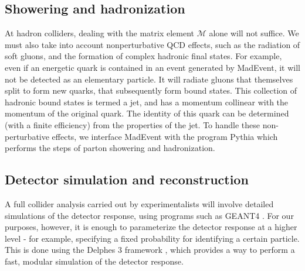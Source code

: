 \subsection{Showering and hadronization}
At hadron colliders, dealing with the matrix element $\mathcal{M}$ alone will not suffice. We must also take into account nonperturbative QCD effects, such as the radiation of soft gluons, and the formation of complex hadronic final states. For example, even if an energetic quark is contained in an event generated by MadEvent, it will not be detected as an elementary particle. It will radiate gluons that themselves split to form new quarks, that subsequently form bound states. This collection of hadronic bound states is termed a jet, and has a momentum collinear with the momentum of the original quark. The identity of this quark can be determined (with a finite efficiency) from the properties of the jet. To handle these non-perturbative effects, we interface MadEvent with the program Pythia\citep{Sjostrand2006} which performs the steps of parton showering and hadronization.
\subsection{Detector simulation and reconstruction}
A full collider analysis carried out by experimentalists will involve detailed simulations of the detector response, using programs such as GEANT4 \citep{Agostinelli2003}. For our purposes, however, it is enough to parameterize the detector response at a higher level - for example, specifying a fixed probability for identifying a certain particle. This is done using the Delphes 3 framework \citep{DeFavereau2014a}, which provides a way to perform a fast, modular simulation of the detector response. 


